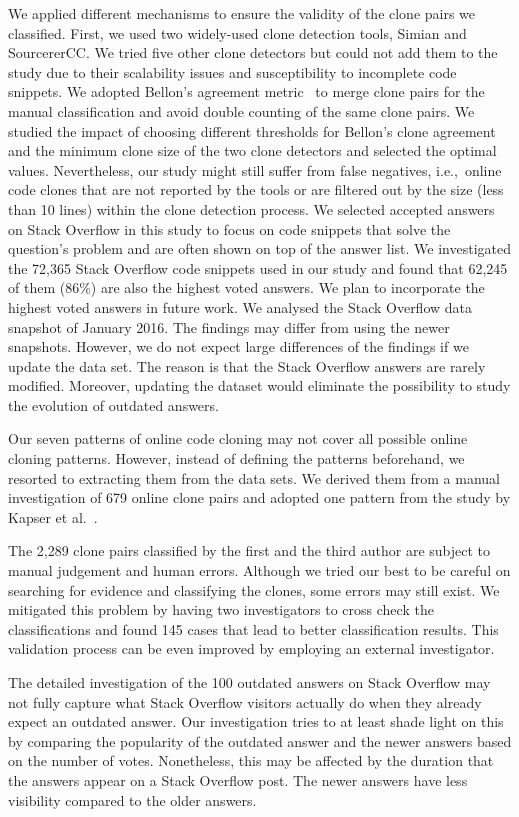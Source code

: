 \documentclass[10pt,journal,compsoc]{IEEEtran}
\begin{document}
We applied different mechanisms to ensure the validity of the clone pairs we
classified.  First, we used two widely-used clone detection tools, Simian and
SourcererCC.  We tried five other clone detectors but could not add them to the
study due to their scalability issues and susceptibility to incomplete code
snippets. We adopted Bellon's agreement metric~\cite{Bellon2007} to merge clone
pairs for the manual classification and avoid double counting of the same clone
pairs. We studied the impact of choosing different thresholds for Bellon's clone agreement and the minimum clone
size of the two clone detectors and selected the optimal values.
Nevertheless, our study might still suffer from false negatives,
i.e.,~online code clones that are not reported by the tools or are filtered out
by the size (less than 10 lines) within the clone detection process. We selected
accepted answers on Stack Overflow in this study to focus on code snippets that
solve the question's problem and are often shown on top of the answer list.
We investigated the 72,365 Stack Overflow code snippets used in our study and
found that 62,245 of them (86\%) are also the highest voted answers.
We plan to incorporate the highest voted answers in future work.
We analysed the Stack Overflow data snapshot of January 2016. 
The findings may differ from using the newer snapshots. 
However, we do not expect large differences of the findings 
if we update the data set. The reason is that the Stack Overflow answers 
are rarely modified. Moreover, updating the dataset would eliminate the 
possibility to study the evolution of outdated answers. 

Our seven patterns of online code cloning may not cover all possible online
cloning patterns. However, instead of defining the patterns beforehand, we
resorted to extracting them from the data sets. We derived them from a manual
investigation of 679 online clone pairs and adopted one pattern from the study
by Kapser et al.~\cite{Kapser2003}.

The 2,289 clone pairs classified by the first and the third author are subject
to manual judgement and human errors.  Although we tried our best to be careful
on searching for evidence and classifying the clones, some errors may still
exist. We mitigated this problem by having two investigators to cross check the
classifications and found 145 cases that lead to better classification results.
This validation process can be even improved by employing an external
investigator. 

The detailed investigation of the 100 outdated answers on Stack Overflow may not
fully capture what Stack Overflow visitors actually do when they already expect
an outdated answer. Our investigation tries to at least shade light on
this by comparing the popularity of the outdated answer and the newer answers
based on the number of votes. Nonetheless, this may be affected by the duration that the
answers appear on a Stack Overflow post. The newer answers have less visibility
compared to the older answers.
\end{document}
